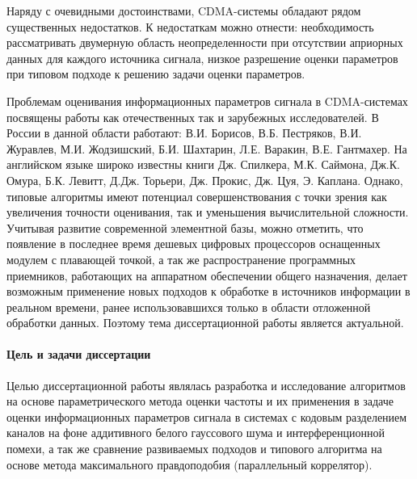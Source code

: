 Наряду с очевидными достоинствами, CDMA-системы обладают рядом существенных недостатков. К недостаткам можно отнести: необходимость рассматривать
двумерную область неопределенности при отсутствии априорных данных для каждого источника сигнала, низкое разрешение оценки параметров при типовом подходе
к решению задачи оценки параметров.

Проблемам оценивания информационных параметров сигнала в CDMA-системах посвящены работы как отечественных так и зарубежных исследователей.
В России в данной области работают: В.И. Борисов, В.Б. Пестряков, В.И. Журавлев, М.И. Жодзишский,
Б.И. Шахтарин, Л.Е. Варакин, В.Е. Гантмахер. На английском языке широко известны книги
Дж. Спилкера, М.К. Саймона, Дж.К. Омура, Б.К. Левитт, Д.Дж. Торьери, Дж. Прокис, Дж. Цуя, Э. Каплана.
Однако, типовые алгоритмы имеют потенциал совершенствования с точки зрения как увеличения точности оценивания, так и уменьшения вычислительной сложности.
Учитывая развитие современной элементной базы, можно отметить, что появление в последнее время дешевых цифровых процессоров оснащенных модулем
с плавающей точкой, а так же распространение программных приемников, работающих на аппаратном обеспечении общего назначения, 
делает возможным применение новых подходов к обработке в источников информации в реальном времени, ранее использовавшихся только в области отложенной обработки данных.
Поэтому тема диссертационной работы является актуальной.

\paragraph{Цель и задачи диссертации}
Целью диссертационной работы являлась разработка и исследование алгоритмов на основе параметрического метода оценки частоты 
и их применения в задаче оценки информационных параметров сигнала в системах с кодовым разделением каналов на фоне аддитивного белого гауссового шума и интерференционной помехи,
а так же сравнение развиваемых подходов и типового алгоритма на основе метода максимального правдоподобия (параллельный коррелятор).

